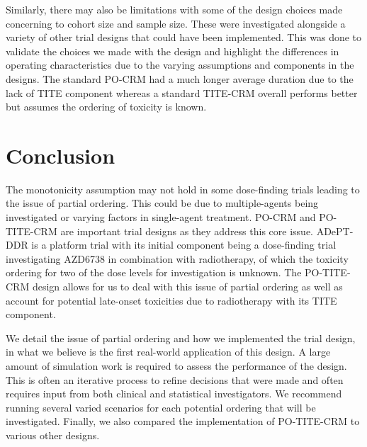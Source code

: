 Similarly, there may also be limitations with some of the design choices made concerning to cohort size and sample size. These were investigated alongside a variety of other trial designs that could have been implemented. This was done to validate the choices we made with the design and highlight the differences in operating characteristics due to the varying assumptions and components in the designs. The standard PO-CRM had a much longer average duration due to the lack of TITE component whereas a standard TITE-CRM overall performs better but assumes the ordering of toxicity is known. 



\section{Conclusion}  
\label{adept:Conclusion}

The monotonicity assumption may not hold in some dose-finding trials leading to the issue of partial ordering. This could be due to multiple-agents being investigated or varying factors in single-agent treatment. PO-CRM and PO-TITE-CRM are important trial designs as they address this core issue. ADePT-DDR is a platform trial with its initial component being a dose-finding trial investigating AZD6738 in combination with radiotherapy, of which the toxicity ordering for two of the dose levels for investigation is unknown. The PO-TITE-CRM design allows for us to deal with this issue of partial ordering as well as account for potential late-onset toxicities due to radiotherapy with its TITE component. 

We detail the issue of partial ordering and how we implemented the trial design, in what we believe is the first real-world application of this design. A large amount of simulation work is required to assess the performance of the design. This is often an iterative process to refine decisions that were made and often requires input from both clinical and statistical investigators. We recommend running several varied scenarios for each potential ordering that will be investigated. Finally, we also compared the implementation of PO-TITE-CRM to various other designs. 

